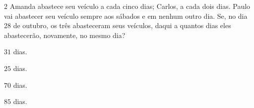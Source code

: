 

\num{2}  Amanda abastece seu veículo a cada cinco dias; Carlos, a cada dois dias.
Paulo vai abastecer seu veículo sempre aos sábados e em nenhum outro
dia. Se, no dia 28 de outubro, os três abasteceram seus veículos, daqui a
quantos dias eles abastecerão, novamente, no mesmo dia?

\begin{escolha}
\item $31$ dias.
\item $25$ dias.
\item $70$ dias.
\item $85$ dias.
\end{escolha}



